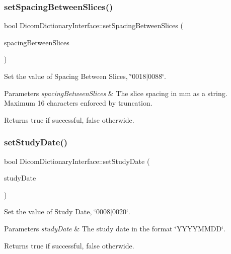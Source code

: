 \subsubsection{\texorpdfstring{set\+Spacing\+Between\+Slices()}{setSpacingBetweenSlices()}}
{\footnotesize\ttfamily bool Dicom\+Dictionary\+Interface\+::set\+Spacing\+Between\+Slices (\begin{DoxyParamCaption}\item[{Q\+String}]{spacing\+Between\+Slices }\end{DoxyParamCaption})}



Set the value of Spacing Between Slices, \char`\"{}0018$\vert$0088\char`\"{}. 


\begin{DoxyParams}{Parameters}
{\em spacing\+Between\+Slices} & The slice spacing in mm as a string. Maximum 16 characters enforced by truncation. \\
\hline
\end{DoxyParams}
\begin{DoxyReturn}{Returns}
true if successful, false otherwide. 
\end{DoxyReturn}
\mbox{\label{class_dicom_dictionary_interface_ac1e6c749f2e192704cf0c9fe09e898ca}} 
\subsubsection{\texorpdfstring{set\+Study\+Date()}{setStudyDate()}}
{\footnotesize\ttfamily bool Dicom\+Dictionary\+Interface\+::set\+Study\+Date (\begin{DoxyParamCaption}\item[{Q\+String}]{study\+Date }\end{DoxyParamCaption})}



Set the value of Study Date, \char`\"{}0008$\vert$0020\char`\"{}. 


\begin{DoxyParams}{Parameters}
{\em study\+Date} & The study date in the format \char`\"{}\+Y\+Y\+Y\+Y\+M\+M\+D\+D\char`\"{}. \\
\hline
\end{DoxyParams}
\begin{DoxyReturn}{Returns}
true if successful, false otherwide. 
\end{DoxyReturn}
\mbox{\label{class_dicom_dictionary_interface_a9e9f77bd949b1e3b6b31899fd8ad68ec}} 
